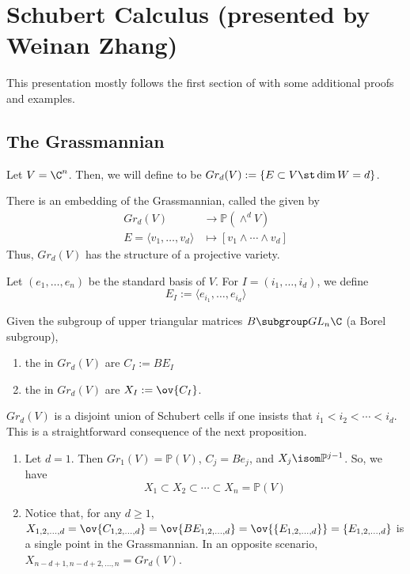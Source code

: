 \documentclass[11pt,leqno,oneside]{amsbook}
\renewcommand{\P}{\mathbb{P}}
\numberwithin{thm}{section}
\newcommand{\Gr}{Gr}
\begin{document}
\section{Schubert Calculus (presented by Weinan Zhang)}
This presentation mostly follows the first section of \cite{brion}
with some additional proofs and examples.
\subsection{The Grassmannian}
\begin{defn}
  Let \(V = \C^n\). Then, we will define  to be \(\Gr_d(V) := \{E \subset V
  \st \dim W = d\}\). 
\end{defn}
\begin{prop}
  There is an embedding of the Grassmannian, called the
   given by
  \begin{align*}
    \Gr_d(V) & \to \P\left(\wedge^d V  \right) \\
    E = \langle v_1, \ldots, v_d \rangle & \mapsto [v_1 \wedge \cdots
                                           \wedge v_d]
  \end{align*}
  Thus, \(\Gr_d(V)\) has the structure of a projective variety.
\end{prop}
\begin{defn}
  Let \((e_1, \ldots, e_n)\) be the standard basis of \(V\). For \(I =
  (i_1, \ldots, i_d)\), we define \[
    E_I := \langle e_{i_1}, \ldots, e_{i_d} \rangle
  \]
\end{defn}
\begin{defn}
  Given the subgroup of upper triangular matrices \(B \subgroup
  GL_n\C\) (a Borel subgroup),
  \begin{enumerate}
  \item the  in \(\Gr_d(V)\) are \(C_I := BE_I\)
  \item the  in \(\Gr_d(V)\) are \(X_I :=
    \ov{C_I}\). 
  \end{enumerate}
\end{defn}
\begin{rmk}
  \(\Gr_d(V)\) is a disjoint union of Schubert cells if one insists
  that \(i_1 < i_2 < \cdots < i_d\). This is a
  straightforward consequence of the next proposition.
\end{rmk}
\begin{example}
  \begin{enumerate}
  \item Let \(d=1\). Then \(\Gr_1(V) = \P(V)\), \(C_j = Be_j\), and
    \(X_j \isom \P^{j-1}\). So, we have
    \[ X_1 \subset X_2 \subset \cdots \subset X_n = \P(V)
    \]
  \item Notice that, for any \(d \geq 1\), \(X_{1,2,\ldots,d} =
    \ov{C_{1,2,\ldots,d}} = \ov{BE_{1,2,\ldots,d}} =
    \ov{\{E_{1,2,\ldots,d}\}} = \{E_{1,2,\ldots,d}\}\) is a single
    point in the Grassmannian. In
    an opposite scenario, \(X_{n-d+1, n-d+2, \ldots, n} = \Gr_d(V)\).
  \end{enumerate}
\end{example}
\end{document}
